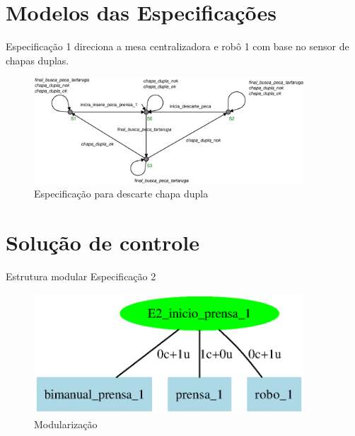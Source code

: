 \section{Modelos das Especificações}
Especificação 1 direciona a mesa centralizadora e robô 1 com base no sensor de chapas duplas.
\begin{figure}[H]%
    \centering
    \includegraphics[width=0.9\textwidth]{imagens/E1_decide_chapa_dupla.eps}
    \caption{Especificação para descarte chapa dupla}\label{fig:especificacao1}
\end{figure}

\section{Solução de controle}
Estrutura modular Especificação 2
\begin{figure}[H]%
    \centering
    \includegraphics[width=0.9\textwidth]{imagens/Modular_structure.eps}
    \caption{Modularização}\label{fig:modular}
\end{figure}